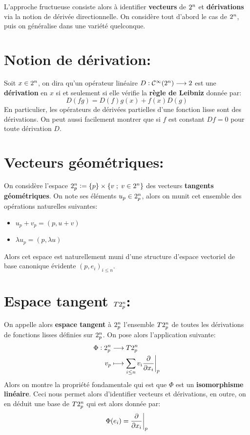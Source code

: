 L'approche fructueuse consiste alors à identifier \textbf{vecteurs} de \( 2^n \) et \textbf{dérivations} via la notion de dérivée directionnelle. On considère tout d'abord le cas de \( 2^n \), puis on généralise dans une variété quelconque.

\section{Notion de dérivation:}
Soit \(x \in 2^n\), on dira qu'un opérateur linéaire \( D: \mathcal{C}^\infty(2^n) \longrightarrow 2 \) est une \textbf{dérivation} en \( x \) si et seulement si elle vérifie la \textbf{règle de Leibniz} donnée par:
\[ 
   D(fg) = D(f)g(x) + f(x)D(g) 
\]
En particulier, les opérateurs de dérivées partielles d'une fonction lisse sont des dérivations. On peut aussi facilement montrer que si \( f \) est constant \( Df = 0 \) pour toute dérivation \( D \).
\section{Vecteurs géométriques:}
On considère l'espace \(2^n_p := \left\{ p \right\} \times \left\{ v \; ; \; v \in 2^n \right\}\) des vecteurs \textbf{tangents géométriques}. On note ses éléments \( u_p \in 2^n_p\), alors on munit cet ensemble des opérations naturelles suivantes:
\begin{itemize}
   \item \(u_p + v_p = (p, u + v)\)
   \item \(\lambda u_p = (p, \lambda u)\)
\end{itemize}
Alors cet espace est naturellement muni d'une structure d'espace vectoriel de base canonique évidente \( (p, e_i)_{i \leq n} \).
\section{Espace tangent \( T2^n_p \):}
On appelle alors \textbf{espace tangent} à \( 2^n_p \) l'ensemble \( T2^n_p \) de toutes les dérivations de fonctions lisses définies sur \( 2^n_p \). On pose alors l'application suivante:
\[ 
   \begin{aligned}
      \Phi : 2^n_p &\longrightarrow T2^n_p \\
      v_p &\longmapsto \sum_{i \leq n} v_i \frac{\partial }{\partial x_i}\biggr|_p
   \end{aligned} 
\]
Alors on montre la propriété fondamentale qui est que \( \Phi \) est un \textbf{isomorphisme linéaire}. Ceci nous permet alors d'identifier vecteurs et dérivations, en outre, on en déduit une base de \( T2^n_p \) qui est alors donnée par:
\[ 
   \Phi(e_i) = \frac{\partial }{\partial x_i}\biggr|_p
\] 
